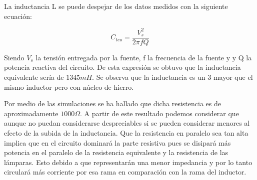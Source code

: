 La inductancia L se puede despejar de los datos medidos con la siguiente ecuación:

\begin{equation}
C_{teo} = \frac{V_s^2}{2\pi fQ }
\label{eq:potencia_activa}
\end{equation}


Siendo $V_s$ la tensión entregada por la fuente, f la frecuencia de la fuente y y Q la potencia reactiva del circuito. De esta expresión se obtuvo que la inductancia equivalente sería de $1345mH$. Se observa que la inductancia es un $3$ mayor que el mismo inductor pero con núcleo de hierro. 

Por medio de las simulaciones se ha hallado que dicha resistencia es de aproximadamente $1000\Omega$. A partir de este resultado podemos considerar que aunque no puedan considerarse despreciables si se pueden considerar menores al efecto de la subida de la inductancia.  Que la resistencia en paralelo sea tan alta implica que en el circuito dominará la parte resistiva pues se disipará más potencia en el paralelo de la resistencia equivalente y la resistencia de las lámparas. Esto debido a que representarán una menor impedancia y por lo tanto circulará más corriente por esa rama en comparación con la rama del inductor.  

